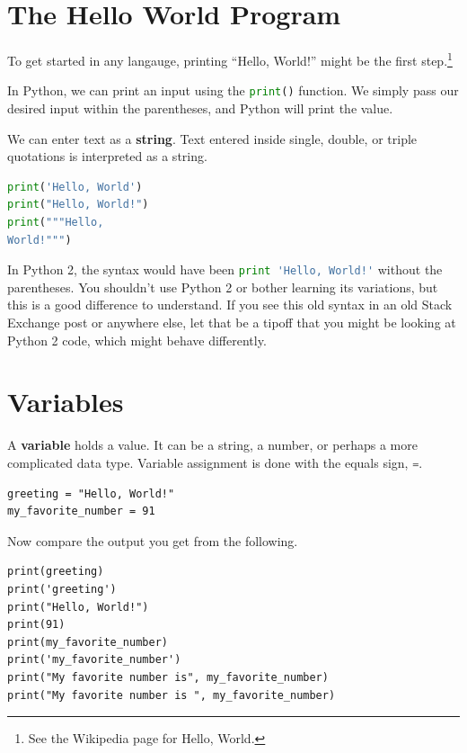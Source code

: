 \section{The Hello World Program}

To get started in any langauge, printing ``Hello, World!'' might be the first step.\footnote{See
{the Wikipedia page for Hello, World.}}

\smallskip

In Python, we can print an input using the \lstinline[language = Python]{print()} function. We simply pass our
desired input within the parentheses, and Python will print the value.

 We can enter text as a \textbf{string}. Text entered inside single, double, or triple quotations is interpreted as a string.


\begin{lstlisting}[language = Python]
print('Hello, World')
print("Hello, World!")
print("""Hello,
World!""") \end{lstlisting}


\smallskip

In Python 2, the syntax would have been \lstinline[language = Python]{print 'Hello, World!'} without the parentheses. You shouldn't use Python 2 or bother learning its variations, but this is a good difference to understand. If you see this old syntax in an old Stack Exchange post or anywhere else, let that be a tipoff that you might be looking at Python 2 code, which might behave differently.

\section{Variables}

A \textbf{variable} holds a value. It can be a string, a number, or perhaps a more complicated data type.
Variable assignment is done with the equals sign, \lstinline[language = Python]{=}.


\smallskip

\begin{lstlisting}
greeting = "Hello, World!"
my_favorite_number = 91
\end{lstlisting}

\smallskip

\noindent Now compare the output you get from the following.

\begin{lstlisting}
print(greeting)
print('greeting')
print("Hello, World!")
print(91)
print(my_favorite_number)
print('my_favorite_number')
print("My favorite number is", my_favorite_number)
print("My favorite number is ", my_favorite_number)
\end{lstlisting}


